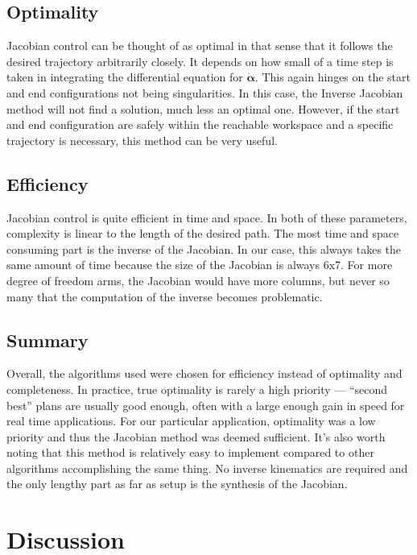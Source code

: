\documentclass[10pt, conference]{IEEEtran}
\begin{document}
\subsection{Optimality}
\label{sec-5-2}

   Jacobian control can be thought of as optimal in that sense that it
   follows the desired trajectory arbitrarily closely. It depends on how
   small of a time step is taken in integrating the differential
   equation for \(\mathbf{\dot{\alpha}}\). This again hinges on the
   start and end configurations not being singularities. In this case,
   the Inverse Jacobian method will not find a solution, much less an
   optimal one. However, if the start and end configuration are safely
   within the reachable workspace and a specific trajectory is
   necessary, this method can be very useful.
\subsection{Efficiency}
\label{sec-5-3}


   Jacobian control is quite efficient in time and space. In both of
   these parameters, complexity is linear to the length of the desired
   path. The most time and space consuming part is the inverse of the
   Jacobian. In our case, this always takes the same amount of time
   because the size of the Jacobian is always 6x7. For more degree of
   freedom arms, the Jacobian would have more columns, but never so
   many that the computation of the inverse becomes problematic.
\subsection{Summary}
\label{sec-5-4}


   Overall, the algorithms used were chosen for efficiency instead of
   optimality and completeness. In practice, true optimality is rarely
   a high priority — “second best” plans are usually good enough, often
   with a large enough gain in speed for real time applications. For
   our particular application, optimality was a low priority and thus
   the Jacobian method was deemed sufficient. It’s also worth noting
   that this method is relatively easy to implement compared to other
   algorithms accomplishing the same thing. No inverse kinematics are
   required and the only lengthy part as far as setup is the synthesis
   of the Jacobian.
\section{Discussion}
\label{sec-6}
\end{document}
